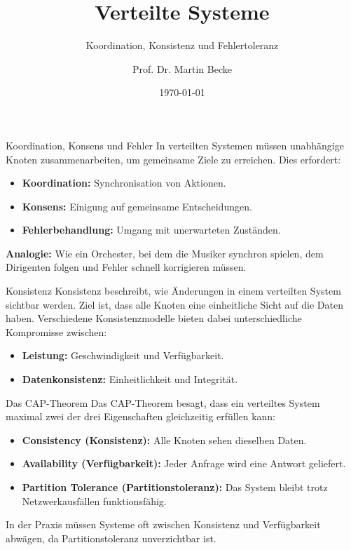 \documentclass{beamer}
\title{Verteilte Systeme}
\subtitle{Koordination, Konsistenz und Fehlertoleranz}
\author{Prof. Dr. Martin Becke}
\date{\today}
\begin{document}
\begin{frame}
    \titlepage
\end{frame}

\begin{frame}{Koordination, Konsens und Fehler}
    In verteilten Systemen müssen unabhängige Knoten zusammenarbeiten, um gemeinsame Ziele zu erreichen. Dies erfordert:
    \begin{itemize}
        \item \textbf{Koordination:} Synchronisation von Aktionen.
        \item \textbf{Konsens:} Einigung auf gemeinsame Entscheidungen.
        \item \textbf{Fehlerbehandlung:} Umgang mit unerwarteten Zuständen.
    \end{itemize}
    \textbf{Analogie:} Wie ein Orchester, bei dem die Musiker synchron spielen, dem Dirigenten folgen und Fehler schnell korrigieren müssen.
\end{frame}

\begin{frame}{Konsistenz}
    Konsistenz beschreibt, wie Änderungen in einem verteilten System sichtbar werden. Ziel ist, dass alle Knoten eine einheitliche Sicht auf die Daten haben. \newline
    Verschiedene Konsistenzmodelle bieten dabei unterschiedliche Kompromisse zwischen:
    \begin{itemize}
        \item \textbf{Leistung:} Geschwindigkeit und Verfügbarkeit.
        \item \textbf{Datenkonsistenz:} Einheitlichkeit und Integrität.
    \end{itemize}
\end{frame}

\begin{frame}{Das CAP-Theorem}
    Das CAP-Theorem besagt, dass ein verteiltes System maximal zwei der drei Eigenschaften gleichzeitig erfüllen kann:
    \begin{itemize}
        \item \textbf{Consistency (Konsistenz):} Alle Knoten sehen dieselben Daten.
        \item \textbf{Availability (Verfügbarkeit):} Jeder Anfrage wird eine Antwort geliefert.
        \item \textbf{Partition Tolerance (Partitionstoleranz):} Das System bleibt trotz Netzwerkausfällen funktionsfähig.
    \end{itemize}
    In der Praxis müssen Systeme oft zwischen Konsistenz und Verfügbarkeit abwägen, da Partitionstoleranz unverzichtbar ist.
\end{frame}
\end{document}
